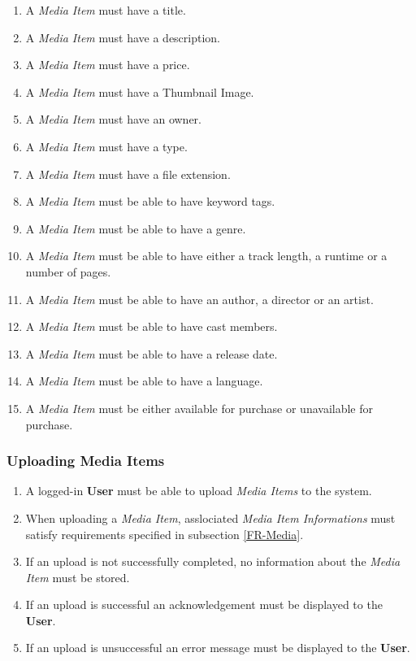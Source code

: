 \begin{enumerate}[label=\textbf{FR-\twodigits*}, resume]
	\item A \textit{Media Item} must have a title.
	\item A \textit{Media Item} must have a description.
	\item A \textit{Media Item} must have a price.
	\item A \textit{Media Item} must have a Thumbnail Image.
	\item A \textit{Media Item} must have an owner.
	\item A \textit{Media Item} must have a type.
	\item A \textit{Media Item} must have a file extension.
	\item A \textit{Media Item} must be able to have keyword tags.
	\item A \textit{Media Item} must be able to have a genre.
	\item A \textit{Media Item} must be able to have either a track length, a runtime or a number of pages.
	\item A \textit{Media Item} must be able to have an author, a director or an artist.
	\item A \textit{Media Item} must be able to have cast members.
	\item A \textit{Media Item} must be able to have a release date.
	\item A \textit{Media Item} must be able to have a language.
	
	\item A \textit{Media Item} must be either available for purchase or unavailable for purchase.
\end{enumerate}

\subsubsection {Uploading Media Items}

\begin{enumerate}[label=\textbf{FR-\twodigits*}, resume]
	\item A logged-in \textbf{User} must be able to upload \textit{Media Items} to the system.
	\item When uploading a \textit{Media Item}, asslociated \textit{Media Item Informations} must satisfy requirements specified in subsection \ref{FR-Media}.
	\item If an upload is not successfully completed, no information about the \textit{Media Item} must be stored.
	\item If an upload is successful an acknowledgement must be displayed to the \textbf{User}.
	\item If an upload is unsuccessful an error message must be displayed to the \textbf{User}. 
\end{enumerate}

